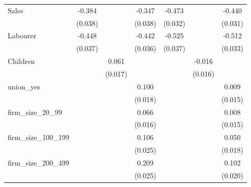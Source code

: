 {\begin{tabular}{l*{6}{c}}
Sales               &      -0.384\sym{***}&                     &      -0.347\sym{***}&      -0.473\sym{***}&                     &      -0.440\sym{***}\\
                    &     (0.038)         &                     &     (0.038)         &     (0.032)         &                     &     (0.031)         \\
Labourer            &      -0.448\sym{***}&                     &      -0.442\sym{***}&      -0.525\sym{***}&                     &      -0.512\sym{***}\\
                    &     (0.037)         &                     &     (0.036)         &     (0.037)         &                     &     (0.033)         \\
Children            &                     &       0.061\sym{***}&                     &                     &      -0.016         &                     \\
                    &                     &     (0.017)         &                     &                     &     (0.016)         &                     \\
union\_yes           &                     &                     &       0.100\sym{***}&                     &                     &       0.009         \\
                    &                     &                     &     (0.018)         &                     &                     &     (0.015)         \\
firm\_size\_20\_99     &                     &                     &       0.066\sym{***}&                     &                     &       0.008         \\
                    &                     &                     &     (0.016)         &                     &                     &     (0.015)         \\
firm\_size\_100\_199   &                     &                     &       0.106\sym{***}&                     &                     &       0.050\sym{***}\\
                    &                     &                     &     (0.025)         &                     &                     &     (0.018)         \\
firm\_size\_200\_499   &                     &                     &       0.209\sym{***}&                     &                     &       0.102\sym{***}\\
                    &                     &                     &     (0.025)         &                     &                     &     (0.020)         \\

\end{tabular}}
